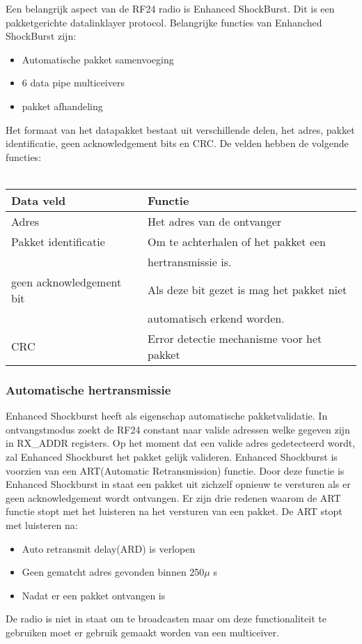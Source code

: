 \documentclass{article}
\begin{document}
Een belangrijk aspect van de RF24 radio is Enhanced ShockBurst. Dit is een pakketgerichte datalinklayer protocol.
Belangrijke functies van Enhanched ShockBurst zijn:
\begin{itemize}
	\item Automatische pakket samenvoeging
	\item 6 data pipe multiceivers
	\item pakket afhandeling
\end{itemize}
Het formaat van het datapakket bestaat uit verschillende delen, het adres, pakket identificatie, geen acknowledgement bits en CRC. De velden hebben de volgende functies:
\\
\\
\begin{tabular}{ | l | l |}
    \hline
    Data veld					& Functie	\\ \hline
    Adres						& Het adres van de ontvanger	\\ \hline
    Pakket identificatie		& Om te achterhalen of het pakket een \\
    							& hertransmissie is.\\\hline
    geen acknowledgement bit	& Als deze bit gezet is mag het pakket niet\\
    							& automatisch erkend worden.	\\ \hline
    CRC							& Error detectie mechanisme voor het pakket			\\ \hline
    \end{tabular}
    
\subsubsection{Automatische hertransmissie}

Enhanced Shockburst heeft als eigenschap automatische pakketvalidatie. In ontvangstmodus zoekt de RF24 constant naar valide adressen welke gegeven zijn in RX\_ADDR registers. Op het moment dat een valide adres gedetecteerd wordt, zal Enhanced Shockburst het pakket gelijk valideren. Enhanced Shockburst is voorzien van een ART(Automatic Retransmission) functie. Door deze functie is Enhanced Shockburst in staat een pakket uit zichzelf opnieuw te versturen als er geen acknowledgement wordt ontvangen. Er zijn drie redenen waarom de ART functie stopt met het luisteren na het versturen van een pakket. De ART stopt met luisteren na:
\begin{itemize}
	\item Auto retransmit delay(ARD) is verlopen
	\item Geen gematcht adres gevonden binnen 250$\mu$ s
	\item Nadat er een pakket ontvangen is
\end{itemize}
De radio is niet in staat om te broadcasten maar om deze functionaliteit te gebruiken moet er gebruik gemaakt worden van een multiceiver. 
\end{document}

